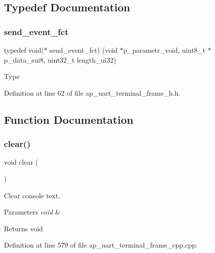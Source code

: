 \subsection{Typedef Documentation}
\mbox{\label{group___u_a_r_t__terminal_ga1d68ed9ea85b1c3bb5539abad6d7e4f1}} 
\subsubsection{send\_event\_fct}
{\footnotesize\ttfamily typedef void($\ast$ send\+\_\+event\+\_\+fct) (void $\ast$p\+\_\+parametr\+\_\+void, uint8\+\_\+t $\ast$p\+\_\+data\+\_\+sui8, uint32\+\_\+t length\+\_\+ui32)}

Type 

Definition at line 62 of file ap\+\_\+uart\+\_\+terminal\+\_\+frame\+\_\+h.\+h.



\subsection{Function Documentation}
\mbox{\label{group___u_a_r_t__terminal_gae683fe63c33c388e9ba1c6392dd477eb}} 
\subsubsection{clear()}
{\footnotesize\ttfamily void clear (\begin{DoxyParamCaption}\item[{void}]{ }\end{DoxyParamCaption})}



Clear console text. 


\begin{DoxyParams}{Parameters}
{\em void} & \\
\hline
\end{DoxyParams}
\begin{DoxyReturn}{Returns}
void 
\end{DoxyReturn}


Definition at line 579 of file ap\+\_\+uart\+\_\+terminal\+\_\+frame\+\_\+cpp.\+cpp.

\mbox{\label{group___u_a_r_t__terminal_ga39ec9a45c5fdf3b61ef3ca88973bc07c}} 
